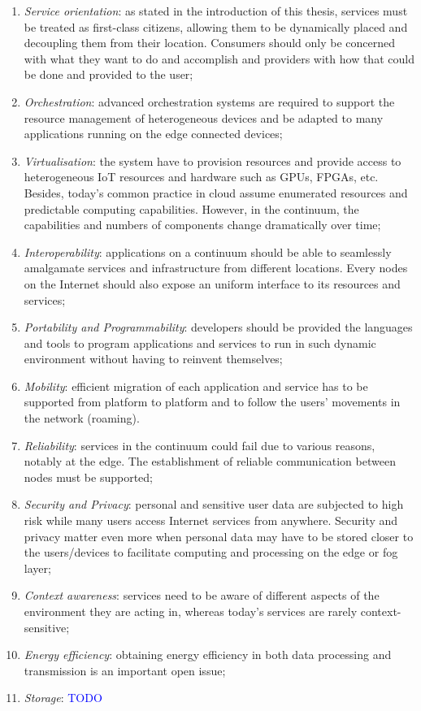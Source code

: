 \documentclass{ieeeaccess}
\begin{document}
\begin{enumerate}
    \item \emph{Service orientation}: as stated in the introduction of this thesis, services must be treated as first-class citizens, allowing them to be dynamically placed and decoupling them from their location. Consumers should only be concerned with what they want to do and accomplish and providers with how that could be done and provided to the user;
    \item \emph{Orchestration}: advanced orchestration systems are required to support the resource management of heterogeneous devices and be adapted to many applications running on the edge connected devices;
    \item \emph{Virtualisation}: the system have to provision resources and provide access to heterogeneous IoT resources and hardware such as GPUs, FPGAs, etc. Besides, today's common practice in cloud assume enumerated resources and predictable computing capabilities. However, in the continuum, the capabilities and numbers of components change dramatically over time;
    \item \emph{Interoperability}: applications on a continuum should be able to seamlessly amalgamate services and infrastructure from different locations. Every nodes on the Internet should also expose an uniform interface to its resources and services;
    \item \emph{Portability and Programmability}: developers should be provided the languages and tools to program applications and services to run in such dynamic environment without having to reinvent themselves;
    \item \emph{Mobility}: efficient migration of each application and service has to be supported from platform to platform and to follow the users’ movements in the network (roaming).
    \item \emph{Reliability}: services in the continuum could fail due to various reasons, notably at the edge. The establishment of reliable communication between nodes must be supported;
    \item \emph{Security and Privacy}: personal and sensitive user data are subjected to high risk while many users access Internet services from anywhere. Security and privacy matter even more when personal data may have to be stored closer to the users/devices to facilitate computing and processing on the edge or fog layer;
    \item \emph{Context awareness}: services need to be aware of different aspects of the environment they are acting in, whereas today's services are rarely context-sensitive;
    \item \emph{Energy efficiency}: obtaining energy efficiency in both data processing and transmission is an important open issue;
    \item \emph{Storage}: \textcolor{blue}{TODO}
\end{enumerate}
\end{document}
